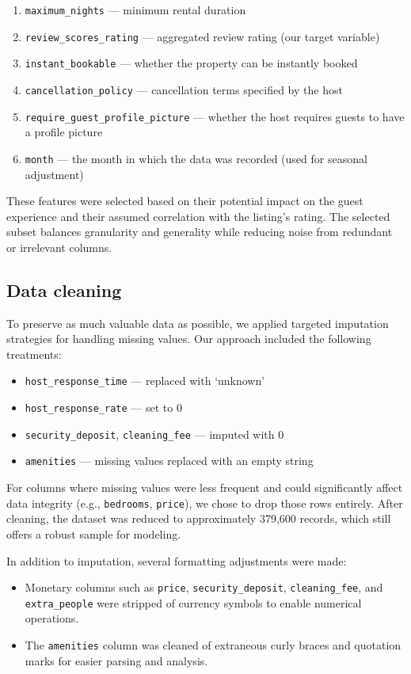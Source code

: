 \begin{enumerate}
  \item \texttt{maximum\_nights} --- minimum rental duration
  \item \texttt{review\_scores\_rating} --- aggregated review rating (our target variable)
  \item \texttt{instant\_bookable} --- whether the property can be instantly booked
  \item \texttt{cancellation\_policy} --- cancellation terms specified by the host
  \item \texttt{require\_guest\_profile\_picture} --- whether the host requires guests to have a profile picture
  \item \texttt{month} --- the month in which the data was recorded (used for seasonal adjustment)
\end{enumerate}

These features were selected based on their potential impact on the guest experience and their assumed correlation with the listing's rating. The selected subset balances granularity and generality while reducing noise from redundant or irrelevant columns.

\subsection{Data cleaning }\label{sec:dataCleaning}
To preserve as much valuable data as possible, we applied targeted imputation strategies for handling missing values. Our approach included the following treatments:

\begin{itemize}
  \item \texttt{host\_response\_time} --- replaced with `unknown'
  \item \texttt{host\_response\_rate} --- set to 0
  \item \texttt{security\_deposit}, \texttt{cleaning\_fee} --- imputed with 0
  \item \texttt{amenities} --- missing values replaced with an empty string
\end{itemize}

For columns where missing values were less frequent and could significantly affect data integrity (e.g., \texttt{bedrooms}, \texttt{price}), we chose to drop those rows entirely. After cleaning, the dataset was reduced to approximately 379,600 records, which still offers a robust sample for modeling.

In addition to imputation, several formatting adjustments were made:
\begin{itemize}
  \item Monetary columns such as \texttt{price}, \texttt{security\_deposit}, \texttt{cleaning\_fee}, and \texttt{extra\_people} were stripped of currency symbols to enable numerical operations.
  \item The \texttt{amenities} column was cleaned of extraneous curly braces and quotation marks for easier parsing and analysis.
\end{itemize}

